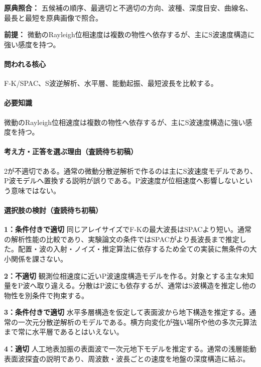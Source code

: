 \noindent\textbf{原典照合：} 五候補の順序、最適切と不適切の方向、波種、深度目安、曲線名、最長と最短を原典画像で照合。\par

\noindent\textbf{前提：} 微動のRayleigh位相速度は複数の物性へ依存するが、主にS波速度構造に強い感度を持つ。\par

\paragraph{問われる核心} F-K/SPAC、S波逆解析、水平層、能動起振、最短波長を比較する。

\paragraph{必要知識} 微動のRayleigh位相速度は複数の物性へ依存するが、主にS波速度構造に強い感度を持つ。

\paragraph{考え方・正答を選ぶ理由（査読待ち初稿）} 2が不適切である。通常の微動分散逆解析で作るのは主にS波速度モデルであり、P波モデルへ置換する説明が誤りである。P波速度が位相速度へ影響しないという意味ではない。

\paragraph{選択肢の検討（査読待ち初稿）}\mbox{}\par

\noindent\textbf{1：条件付きで適切} 同じアレイサイズでF-Kの最大波長はSPACより短い。通常の解析性能の比較であり、実験論文の条件ではSPACがより長波長まで推定した。配置・波の入射・ノイズ・推定算法に依存するため全ての実装に無条件の大小関係を課さない。\par

\noindent\textbf{2：不適切} 観測位相速度に近いP波速度構造モデルを作る。対象とする主な未知量をP波へ取り違える。分散はP波にも依存するが、通常はS波構造を推定し他の物性を別条件で拘束する。\par

\noindent\textbf{3：条件付きで適切} 水平多層構造を仮定して表面波から地下構造を推定する。通常の一次元分散逆解析のモデルである。横方向変化が強い場所や他の多次元算法まで常に水平層であるとはいえない。\par

\noindent\textbf{4：適切} 人工地表加振の表面波で一次元地下モデルを推定する。通常の浅層能動表面波探査の説明であり、周波数・波長ごとの速度を地盤の深度構造に結ぶ。\par

